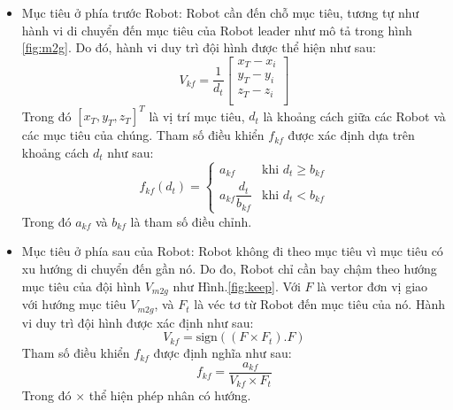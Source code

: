 \begin{itemize}
    \item Mục tiêu ở phía trước Robot: Robot cần đến chỗ mục tiêu, tương tự như hành vi di chuyển đến mục tiêu của Robot leader như mô tả trong hình \ref{fig:m2g}. Do đó, hành vi duy trì đội hình được thể hiện như sau:
         \begin{equation}
            V_{kf}=\dfrac{1}{d_{t}}\left[\begin{array}{c}
            x_{T}-x_i\\
            y_{T}-y_i\\
            z_{T}-z_i\\
            \end{array}\right]
        \end{equation}
        Trong đó $\left[x_T, y_T, z_T\right]^T$ là vị trí mục tiêu, $d_{t}$ là khoảng cách giữa các Robot và các mục tiêu của chúng. Tham số điều khiển $f_{kf}$ được xác định dựa trên khoảng cách $d_{t}$ như sau:
        \begin{equation}
            f_{kf}\left(d_{t}\right)=\left\{ \begin{array}{cc}
            a_{kf} & \text{khi } d_{t}\geq b_{kf}\\
            a_{kf}\dfrac{d_{t}}{b_{kf}} & \text{khi } d_{t}<b_{kf}
            \end{array}\right.
        \end{equation}
        Trong đó $a_{kf}$ và $b_{kf}$ là tham số điều chỉnh.
        
     \item Mục tiêu ở phía sau của Robot: Robot không đi theo mục tiêu vì mục tiêu có xu hướng di chuyển đến gần nó. Do đo, Robot chỉ cần bay chậm theo hướng mục tiêu của đội hình $V_{m2g}$ như Hình.\ref{fig:keep}. Với $F$ là vertor đơn vị giao với hướng mục tiêu $V_{m2g}$, và $F_t$ là véc tơ từ Robot đến mục tiêu của nó. Hành vi duy trì đội hình được xác định như sau:
        \begin{equation}
            V_{kf}= \text{sign}((F\times F_{t}).F)
        \end{equation}
        Tham số điều khiển $f_{kf}$ được định nghĩa như sau:
        \begin{equation}
                 f_{kf}=\frac{a_{kf}}{V_{kf}\times F_t}
            \label{eqn:xyzi1}
        \end{equation}
        Trong đó $\times$ thể hiện phép nhân có hướng.
\end{itemize}